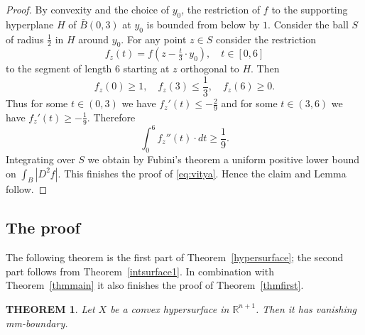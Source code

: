 \documentclass[12pt,leqno,intlimits]{amsart}
\numberwithin{equation}{section}
\newtheorem{thm}{THEOREM}[section]
\theoremstyle{definition}
\theoremstyle{remark}
\newcommand{\tref}[1]{Theorem~\ref{#1}}
\newcommand{\R}{\mathbb{R}}
\begin{document}
\begin{proof}
By convexity and the choice of $y_0$, the restriction of $f$ to the supporting hyperplane $H$ of $\bar B(0,3)$ at $y_0$ is bounded from below by $1$. Consider the ball $S$ of radius $\frac 1 2$ in $H$ around $y_0$. For any point $z\in S$ consider the restriction
$$f_z (t)= f(z- \tfrac t 3\cdot y_0 ),\quad t\in [0,6]$$
to the segment of length $6$ starting at $z$ orthogonal to $H$.
Then
$$f_z(0)\geq 1,\quad
f_z (3)\leq \frac 1 3,\quad
f_z (6) \geq 0.$$
Thus for some $t\in (0,3)$ we have $f_z'(t) \leq -\frac 2 9$ and for some $t\in (3,6)$ we have $f_z'(t) \geq - \frac 1 9$.
Therefore
$$\int _0 ^6 f_z'' (t)\cdot dt \geq \frac 1 9.$$
Integrating over $S$ we obtain by Fubini's theorem a uniform positive lower bound on $\int _{B} |D^2f|$.
This finishes the proof of \eqref{eq:vitya}.
Hence the claim and Lemma follow.
\end{proof}

\subsection{The proof} The following theorem is the first part of \tref{hypersurface};
the second part follows from \tref{intsurface1}.
In combination with \tref{thmmain} it also finishes the proof of \tref{thmfirst}. %

\begin{thm} \label{thmconv}
Let $X$ be a convex hypersurface in $\R^{n+1}$.
Then it has vanishing  mm-boundary.

\end{thm}
\end{document}
